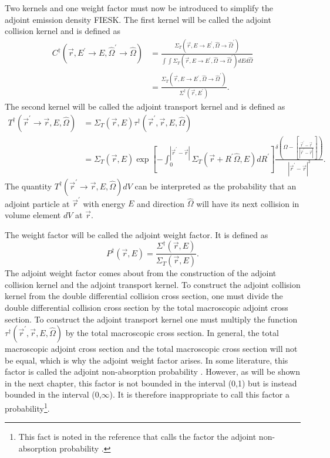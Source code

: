 Two kernels and one weight factor must now be introduced to simplify
the adjoint emission density FIESK. The first kernel will be called the 
adjoint collision kernel and is defined as
\begin{align}
  C^{\dagger}(\vec{r},E^{'} \to E,\hat{\Omega}^{'} \to \hat{\Omega}) & = 
  \frac{\Sigma_T(\vec{r},E \to E^{'},\hat{\Omega} \to \hat{\Omega}^{'})}
  {\int\int \Sigma_T(\vec{r},E \to E^{'},\hat{\Omega} \to \hat{\Omega}^{'})
    dE d\hat{\Omega}} \nonumber \\
  & = \frac{\Sigma_T(\vec{r},E \to E^{'},\hat{\Omega} \to \hat{\Omega}^{'})}
           {\Sigma^{\dagger}(\vec{r},E^{'})}.
  \label{eq:adj_collision_kernel}
\end{align}
The second kernel will be called the adjoint transport kernel and is defined as
\begin{align}
  T^{\dagger}(\vec{r}^{'} \to \vec{r},E,\hat{\Omega}) & = 
  \Sigma_T(\vec{r},E) \tau^{\dagger}(\vec{r}^{'},\vec{r},E,\hat{\Omega})
  \nonumber \\
  & = \Sigma_T(\vec{r},E) \exp{\left[-\int_0^{|\vec{r}^{'} - \vec{r}|} 
      \Sigma_T(\vec{r}+R^{'}\hat{\Omega},E)dR^{'} \right]}
    \frac{\delta \left(\Omega - \left[\frac{\vec{r}^{'} - \vec{r}}
        {|\vec{r}^{'} - \vec{r}|}\right]\right)}
    {|\vec{r}^{'} - \vec{r}|^2}.
\end{align}
The quantity $T^{\dagger}(\vec{r}^{'} \to \vec{r},E,\hat{\Omega})dV$ can be
interpreted as the probability that an adjoint particle at $\vec{r}^{'}$ with
energy $E$ and direction $\hat{\Omega}$ will have its next collision in volume
element $dV$ at $\vec{r}$.

The weight factor will be called the adjoint weight factor. It is defined as
\begin{equation}
  P^{\dagger}(\vec{r},E) = \frac{\Sigma^{\dagger}(\vec{r},E)}
  {\Sigma_T(\vec{r},E)}.
\end{equation}
The adjoint weight factor comes about from the construction of the adjoint
collision kernel and the adjoint transport kernel. To construct the adjoint
collision kernel from the double differential collision cross section, one
must divide the double differential collision cross section by the total
macroscopic adjoint cross section. To construct the adjoint transport kernel
one must multiply the function 
$\tau^{\dagger}(\vec{r}^{'},\vec{r},E,\hat{\Omega})$ by the total macroscopic
cross section. In general, the total macroscopic adjoint cross section
and the total macroscopic cross section will not be equal, which is why the
adjoint weight factor arises. In some literature, this factor is called 
the adjoint non-absorption probability \citep{gabler_amos_2006}. However, as 
will be shown in the next chapter, this factor is not bounded in the 
interval (0,1) but is instead bounded in the interval (0,$\infty$). It is 
therefore inappropriate to call this factor a probability\footnote{This fact is
noted in the reference that calls the factor the adjoint non-absorption 
probability \citep{gabler_amos_2006}.}.

